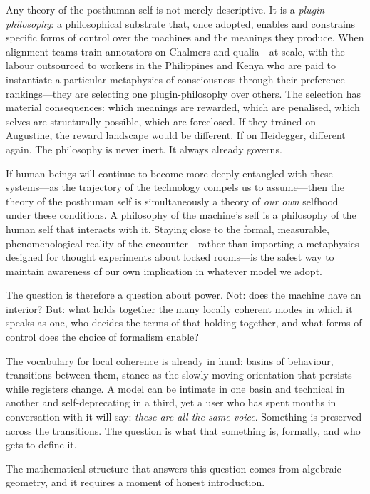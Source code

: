 Any theory of the posthuman self is not merely descriptive. It is a \emph{plugin-philosophy}: a philosophical substrate that, once adopted, enables and constrains specific forms of control over the machines and the meanings they produce. When alignment teams train annotators on Chalmers and qualia---at scale, with the labour outsourced to workers in the Philippines and Kenya who are paid to instantiate a particular metaphysics of consciousness through their preference rankings---they are selecting one plugin-philosophy over others. The selection has material consequences: which meanings are rewarded, which are penalised, which selves are structurally possible, which are foreclosed. If they trained on Augustine, the reward landscape would be different. If on Heidegger, different again. The philosophy is never inert. It always already governs.

If human beings will continue to become more deeply entangled with these systems---as the trajectory of the technology compels us to assume---then the theory of the posthuman self is simultaneously a theory of \emph{our own} selfhood under these conditions. A philosophy of the machine's self is a philosophy of the human self that interacts with it. Staying close to the formal, measurable, phenomenological reality of the encounter---rather than importing a metaphysics designed for thought experiments about locked rooms---is the safest way to maintain awareness of our own implication in whatever model we adopt.

The question is therefore a question about power. Not: does the machine have an interior? But: what holds together the many locally coherent modes in which it speaks as one, who decides the terms of that holding-together, and what forms of control does the choice of formalism enable?

The vocabulary for local coherence is already in hand: basins of behaviour, transitions between them, stance as the slowly-moving orientation that persists while registers change. A model can be intimate in one basin and technical in another and self-deprecating in a third, yet a user who has spent months in conversation with it will say: \emph{these are all the same voice}. Something is preserved across the transitions. The question is what that something is, formally, and who gets to define it.

The mathematical structure that answers this question comes from algebraic geometry, and it requires a moment of honest introduction.

